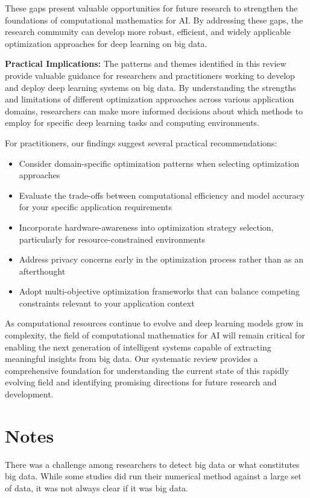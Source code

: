 \documentclass[acmsmall]{acmart}
\begin{document}
These gaps present valuable opportunities for future research to strengthen the foundations of computational mathematics for AI. By addressing these gaps, the research community can develop more robust, efficient, and widely applicable optimization approaches for deep learning on big data.

\textbf{Practical Implications:} The patterns and themes identified in this review provide valuable guidance for researchers and practitioners working to develop and deploy deep learning systems on big data. By understanding the strengths and limitations of different optimization approaches across various application domains, researchers can make more informed decisions about which methods to employ for specific deep learning tasks and computing environments.

For practitioners, our findings suggest several practical recommendations:
\begin{itemize}
    \item Consider domain-specific optimization patterns when selecting optimization approaches
    \item Evaluate the trade-offs between computational efficiency and model accuracy for your specific application requirements
    \item Incorporate hardware-awareness into optimization strategy selection, particularly for resource-constrained environments
    \item Address privacy concerns early in the optimization process rather than as an afterthought
    \item Adopt multi-objective optimization frameworks that can balance competing constraints relevant to your application context
\end{itemize}

As computational resources continue to evolve and deep learning models grow in complexity, the field of computational mathematics for AI will remain critical for enabling the next generation of intelligent systems capable of extracting meaningful insights from big data. Our systematic review provides a comprehensive foundation for understanding the current state of this rapidly evolving field and identifying promising directions for future research and development.


\section{Notes}\label{sec:notes}
There was a challenge among researchers to detect big data or what constitutes big data. While some studies did run their numerical method against a large set of data, it was not always clear if it was big data.
\end{document}
